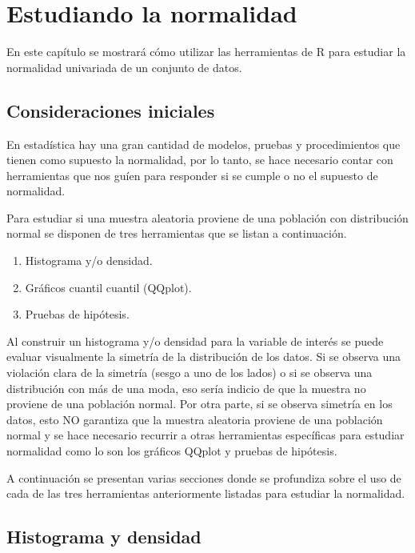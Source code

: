 \documentclass[10pt,]{krantz}
\providecommand{\tightlist}{%
  \setlength{\itemsep}{0pt}\setlength{\parskip}{0pt}}
\let\proglang=\textsf
\begin{document}
\chapter{\texorpdfstring{Estudiando la normalidad
\label{normalidad}}{Estudiando la normalidad }}\label{estudiando-la-normalidad}

En este capítulo se mostrará cómo utilizar las herramientas de
\proglang{R} para estudiar la normalidad univariada de un conjunto de
datos.

\section{Consideraciones iniciales}\label{consideraciones-iniciales}

En estadística hay una gran cantidad de modelos, pruebas y
procedimientos que tienen como supuesto la normalidad, por lo tanto, se
hace necesario contar con herramientas que nos guíen para responder si
se cumple o no el supuesto de normalidad.

Para estudiar si una muestra aleatoria proviene de una población con
distribución normal se disponen de tres herramientas que se listan a
continuación.

\begin{enumerate}
\def\labelenumi{\arabic{enumi}.}
\tightlist
\item
  Histograma y/o densidad.
\item
  Gráficos cuantil cuantil (QQplot).
\item
  Pruebas de hipótesis.
\end{enumerate}

Al construir un histograma y/o densidad para la variable de interés se
puede evaluar visualmente la simetría de la distribución de los datos.
Si se observa una violación clara de la simetría (sesgo a uno de los
lados) o si se observa una distribución con más de una moda, eso sería
indicio de que la muestra no proviene de una población normal. Por otra
parte, si se observa simetría en los datos, esto NO garantiza que la
muestra aleatoria proviene de una población normal y se hace necesario
recurrir a otras herramientas específicas para estudiar normalidad como
lo son los gráficos QQplot y pruebas de hipótesis.

A continuación se presentan varias secciones donde se profundiza sobre
el uso de cada de las tres herramientas anteriormente listadas para
estudiar la normalidad.

\section{Histograma y densidad}\label{histograma-y-densidad}
\end{document}
